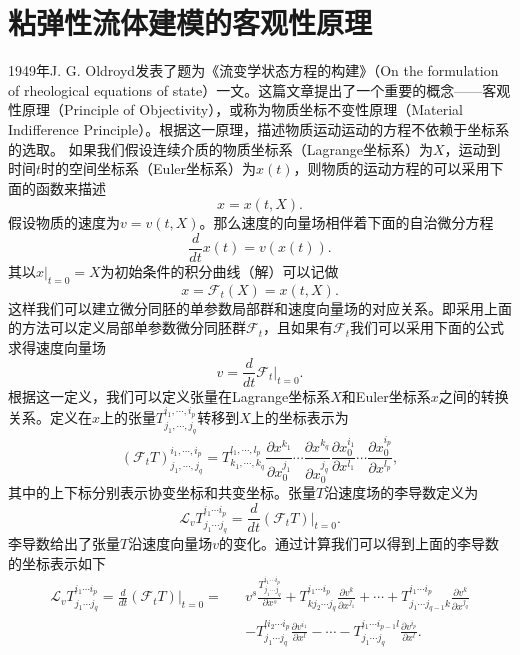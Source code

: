 \section{粘弹性流体建模的客观性原理}
1949年J. G. Oldroyd发表了题为《流变学状态方程的构建》（On the formulation of rheological equations of state）一文\cite{oldroyd1950formulation}。这篇文章提出了一个重要的概念——客观性原理（Principle of Objectivity），或称为物质坐标不变性原理（Material Indifference Principle）。根据这一原理，描述物质运动运动的方程不依赖于坐标系的选取。
如果我们假设连续介质的物质坐标系（Lagrange坐标系）为$X$，运动到时间$t$时的空间坐标系（Euler坐标系）为$x(t)$，则物质的运动方程的可以采用下面的函数来描述
\begin{equation*}
	x = x (t,X).
\end{equation*}
假设物质的速度为$v = v (t,X)$。那么速度的向量场相伴着下面的自治微分方程
\begin{equation*}
	\frac{d}{dt} x(t) = v (x(t)).
\end{equation*}
其以$x|_{t=0}=X$为初始条件的积分曲线（解）可以记做
\begin{equation*}
	x = \mathcal{F}_t (X) = x (t,X).
\end{equation*}
这样我们可以建立微分同胚的单参数局部群和速度向量场的对应关系。即采用上面的方法可以定义局部单参数微分同胚群$\mathcal{F}_t$，且如果有$\mathcal{F}_t$我们可以采用下面的公式求得速度向量场
\begin{equation*}
	v = \frac{d}{dt} \mathcal{F}_t \big|_{t=0}.
\end{equation*}
根据这一定义，我们可以定义张量在Lagrange坐标系$X$和Euler坐标系$x$之间的转换关系。定义在$x$上的张量$T^{i_1,\cdots,i_p}_{j_1, \cdots,j_q}$转移到$X$上的坐标表示为
\begin{equation*}
	(\mathcal{F}_t T)^{i_1,\cdots,i_p}_{j_1, \cdots,j_q} = T^{l_1,\cdots,l_p}_{k_1, \cdots,k_q} \frac{\partial x^{k_1}}{\partial x_0^{j_1}} \cdots \frac{\partial x^{k_q}}{\partial x_0^{j_q}} \frac{\partial x_0^{i_1}}{\partial x^{l_1}} \cdots \frac{\partial x_0^{i_p}}{\partial x^{l_p}},  
\end{equation*}
其中的上下标分别表示协变坐标和共变坐标。张量$T$沿速度场的李导数定义为
\begin{equation*}
	{\mathcal{L}_v T^{i_1 \cdots i_p}_{j_1 \cdots j_q} =\frac{d}{dt} (\mathcal{F}_t T)} |_{t=0}.
\end{equation*}
李导数给出了张量$T$沿速度向量场$v$的变化。通过计算我们可以得到上面的李导数的坐标表示如下
\begin{eqnarray} \label{eq:Lie}
	 {\mathcal{L}_v T^{i_1 \cdots i_p}_{j_1 \cdots j_q} = \frac{d}{dt} (\mathcal{F}_t T)} |_{t=0}  = && v^s \frac{T^{i_1 \cdots i_p}_{j_1\cdots j_q}}{\partial x^s} + T^{i_1 \cdots i_p}_{k j_2 \cdots j_q}\frac{\partial v^k}{\partial x^{j_1}} + \cdots + T^{i_1 \cdots i_p}_{j_1\cdots j_{q-1}k}\frac{\partial v^k}{\partial x^{j_q}} \nonumber
	\\ && - T^{li_2 \cdots i_p}_{j_1\cdots j_q}\frac{\partial v^{i_1}}{\partial x^l}- \cdots - T^{i_1 \cdots i_{p-1}l}_{j_1\cdots j_q}\frac{\partial v^{i_p}}{\partial x^l}. 
\end{eqnarray}
